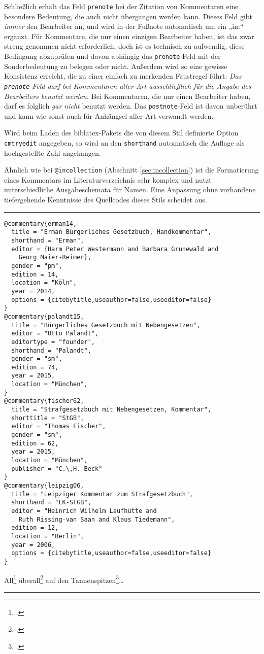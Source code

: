 \documentclass[11pt,a4paper,DIV=calc,draft]{scrartcl}
\newcommand\software[1]{\textsf{#1}}
\newenvironment{rubexample}{\par\vspace{\baselineskip}\hrule\par\begin{refsection}}{\end{refsection}\par\hrule\par\vspace{\baselineskip}}
\begin{document}
Schließlich erhält das Feld \verb+prenote+ bei der Zitation von
Kommentaren eine besondere Bedeutung, die auch nicht übergangen werden
kann. Dieses Feld gibt \emph{immer} den Bearbeiter an, und wird in der
Fußnote automatisch um ein „in:“ ergänzt. Für Kommentare, die nur
einen einzigen Bearbeiter haben, ist das zwar streng genommen nicht
erforderlich, doch ist es technisch zu aufwendig, diese Bedingung
abzuprüfen und davon abhängig das \verb+prenote+-Feld mit der
Sonderbedeutung zu belegen oder nicht. Außerdem wird so eine gewisse
Konsistenz erreicht, die zu einer einfach zu merkenden Faustregel
führt: \emph{Das \texttt{prenote}-Feld darf bei Kommentaren aller Art
  ausschließlich für die Angabe des Bearbeiters benutzt werden.} Bei
Kommentaren, die nur einen Bearbeiter haben, darf es folglich
\emph{gar nicht} benutzt werden. Das \verb+postnote+-Feld ist davon
unberührt und kann wie sonst auch für Anhängsel aller Art verwandt
werden.

Wird beim Laden des \software{biblatex}-Pakets die von diesem Stil
definierte Option \verb+cmtryedit+ angegeben, so wird an den
\verb+shorthand+ automatisch die Auflage als hochgestellte Zahl
angehangen.

Ähnlich wie bei \verb+@incollection+ (Abschnitt
\ref{sec:incollection}) ist die Formatierung eines Kommentars im
Literaturverzeichnis sehr komplex und nutzt unterschiedliche
Ausgabeschemata für Namen. Eine Anpassung ohne vorhandene
tiefergehende Kenntnisse des Quellcodes dieses Stils scheidet aus.

\begin{rubexample}
\begin{verbatim}
@commentary{erman14,
  title = "Erman Bürgerliches Gesetzbuch, Handkommentar",
  shorthand = "Erman",
  editor = {Harm Peter Westermann and Barbara Grunewald and
    Georg Maier-Reimer},
  gender = "pm",
  edition = 14,
  location = "Köln",
  year = 2014,
  options = {citebytitle,useauthor=false,useeditor=false}
}
@commentary{palandt15,
  title = "Bürgerliches Gesetzbuch mit Nebengesetzen",
  editor = "Otto Palandt",
  editortype = "founder",
  shorthand = "Palandt",
  gender = "sm",
  edition = 74,
  year = 2015,
  location = "München",
}
@commentary{fischer62,
  title = "Strafgesetzbuch mit Nebengesetzen, Kommentar",
  shorttitle = "StGB",
  editor = "Thomas Fischer",
  gender = "sm",
  edition = 62,
  year = 2015,
  location = "München",
  publisher = "C.\,H. Beck"
}
@commentary{leipzig06,
  title = "Leipziger Kommentar zum Strafgesetzbuch",
  shorthand = "LK-StGB",
  editor = "Heinrich Wilhelm Laufhütte and
    Ruth Rissing-van Saan and Klaus Tiedemann",
  edition = 12,
  location = "Berlin",
  year = 2006,
  options = {citebytitle,useauthor=false,useeditor=false}
}
\end{verbatim}

All\footcite[Ellenberger][\S\,12 Rnr. 7]{palandt15}
überall\footcite[Grunewald][\S\,12 Rnr. 6]{erman14}
auf den
Tannenspitzen\footcites[][\S\,242 Rnr. 10]{fischer62}[Laufhütte][\S\,242\,Rnr. 15]{leipzig06}\ldots

\printbibliography{}
\end{rubexample}
\end{document}
